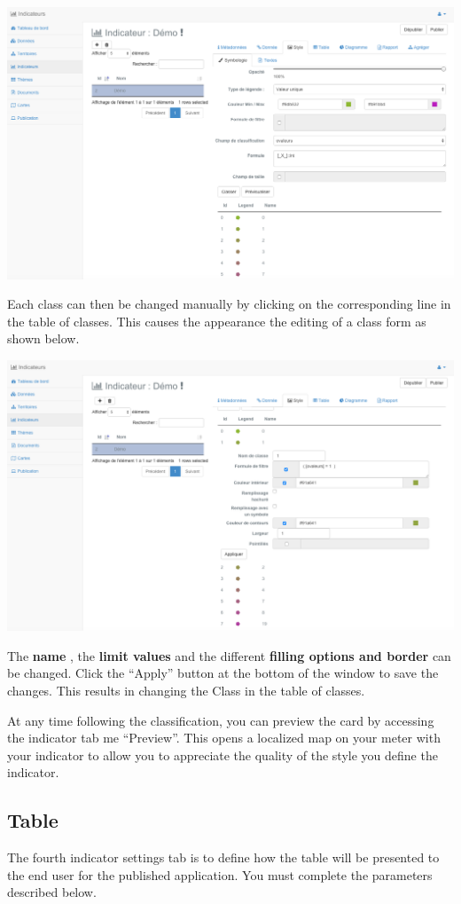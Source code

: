 \documentclass[letterpaper,10pt,english]{sphinxmanual}
\begin{document}
\includegraphics[width=1.000\linewidth]{indicator-classes-table.png}

Each class can then be changed manually by clicking on the corresponding line in the table of classes. This causes the appearance the editing of a class form as shown below.

\includegraphics[width=1.000\linewidth]{indicator-classes.png}

The \textbf{name} , the \textbf{limit values} ​​and the different \textbf{filling options and border} can be changed. Click the ``Apply'' button at the bottom of the window to save the changes. This results in changing the Class in the table of classes.

At any time following the classification, you can preview the card by accessing the indicator tab me ``Preview''. This opens a localized map on your meter with your indicator to allow you to appreciate the quality of the style you define the indicator.


\subsection{Table}
\label{indicators/indicatorspanel:id1}
The fourth indicator settings tab is to define how the table will be presented to the end user for the published application. You must complete the parameters described below.
\end{document}
